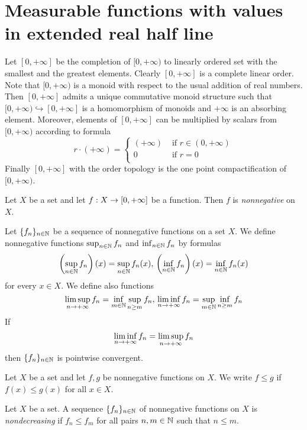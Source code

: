 \documentclass[10pt]{amsart}
\begin{document}
\section{Measurable functions with values in extended real half line}
\noindent
Let $[0,+\infty]$ be the completion of $[0,+\infty)$ to linearly ordered set with the smallest and the greatest elements. Clearly $[0,+\infty]$ is a complete linear order. Note that $[0,+\infty)$ is a monoid with respect to the usual addition of real numbers. Then $[0,+\infty]$ admits a unique commutative monoid structure such that $[0,+\infty) \hookrightarrow [0,+\infty]$ is a homomorphism of monoids and $+\infty$ is an absorbing element. Moreover, elements of $[0,+\infty]$ can be multiplied by scalars from $[0,+\infty)$ according to formula
$$r\cdot (+\infty) = \begin{cases}(+\infty) & \mbox{ if }r\in (0,+\infty) \\
             0         & \mbox{ if }r = 0            \\
	\end{cases}$$
Finally $[0,+\infty]$ with the order topology is the one point compactification of $[0,+\infty)$.

\begin{definition}
	Let $X$ be a set and let $f:X\rightarrow [0,+\infty]$ be a function. Then $f$ is \textit{nonnegative} on $X$.
\end{definition}
\noindent
Let $\{f_n\}_{n\in {\mathbb N}}$ be a sequence of nonnegative functions on a set $X$. We define nonnegative functions $\sup_{n\in {\mathbb N}}f_n$ and $\inf_{n\in {\mathbb N}}f_n$ by formulas
$$\left(\sup_{n\in {\mathbb N}}f_n\right)(x) = \sup_{n\in {\mathbb N}}f_n(x),\,\left(\inf_{n\in {\mathbb N}}f_n\right)(x) = \inf_{n\in {\mathbb N}}f_n(x)$$
for every $x\in X$. We define also functions
$$\limsup_{n\rightarrow +\infty}f_n = \inf_{m\in {\mathbb N}}\sup_{n\geq m}f_n,\,\liminf_{n\rightarrow +\infty}f_n = \sup_{m\in {\mathbb N}}\inf_{n\geq m}f_n$$
If
$$\liminf_{n\rightarrow +\infty}f_n = \limsup_{n\rightarrow +\infty}f_n$$
then $\{f_n\}_{n\in {\mathbb N}}$ is pointwise convergent.

Let $X$ be a set and let $f,g$ be nonnegative functions on $X$. We write $f \leq g$ if $f(x) \leq g(x)$ for all $x\in X$.

\begin{definition}
	Let $X$ be a set. A sequence $\{f_n\}_{n\in {\mathbb N}}$ of nonnegative functions on $X$ is \textit{nondecreasing} if $f_n \leq f_m$ for all pairs $n, m\in {\mathbb N}$ such that $n\leq m$.
\end{definition}
\end{document}
